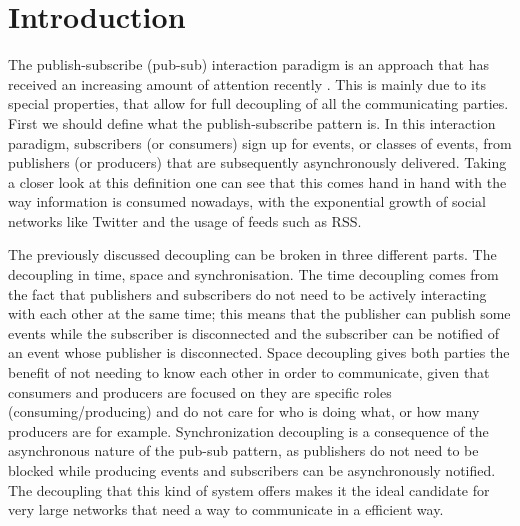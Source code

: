 
%
%

\section{Introduction}

The publish-subscribe (pub-sub) interaction paradigm is an approach that
has received an increasing amount of attention recently \cite{Kermarrec2013} \cite{Eugster2003}.
This is mainly due to its special properties, that allow for full decoupling of all the communicating
parties. First we should define what the publish-subscribe pattern is.
In this interaction paradigm, subscribers (or consumers) sign up for
events, or classes of events, from publishers (or producers) that are
subsequently asynchronously delivered. Taking a closer look at this
definition one can see that this comes hand in hand with the way
information is consumed nowadays, with the exponential growth of social
networks like Twitter and the usage of feeds such as RSS.

The previously discussed decoupling can be broken in three different
parts. The decoupling in time, space and synchronisation. The time
decoupling comes from the fact that publishers and subscribers do not
need to be actively interacting with each other at the same time; this
means that the publisher can publish some events while the subscriber is
disconnected and the subscriber can be notified of an event whose
publisher is disconnected. Space decoupling gives both parties the
benefit of not needing to know each other in order to communicate, given
that consumers and producers are focused on they are specific roles
(consuming/producing) and do not care for who is doing what, or how many
producers are for example. Synchronization decoupling is a consequence
of the asynchronous nature of the pub-sub pattern, as publishers do not
need to be blocked while producing events and subscribers can be
asynchronously notified. The decoupling that this kind of system offers
makes it the ideal candidate for very large networks that need a way to
communicate in a efficient way.

